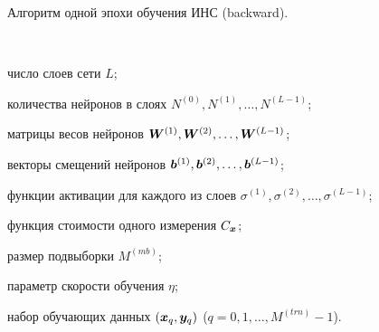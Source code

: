 \documentclass[a4paper,12pt,russian]{article} %
\begin{document}
\begin{algorithm}[t]
	\caption{
		Алгоритм одной эпохи обучения ИНС (backward).
	} \label{alg:nn_back}
	\begin{algorithmic}[1]
    	\Require $\;$
    	
    		число слоев сети $L$;
    		
    		количества нейронов в слоях $N^{(0)}, N^{(1)}, \ldots, N^{(L-1)}$;
    		
    		матрицы весов нейронов $\bm{W}^{(1)}, \bm{W}^{(2)}, \ldots, \bm{W}^{(L-1)}$;
    		
    		векторы смещений нейронов $\bm{b}^{(1)}, \bm{b}^{(2)}, \ldots, \bm{b}^{(L-1)}$;

    		функции активации для каждого из слоев $\sigma^{(1)}, \sigma^{(2)}, \ldots, \sigma^{(L-1)}$;
    		
    		функция стоимости одного измерения $C_{\bm{x}}$;
    		
			размер подвыборки $M^{(mb)}$;
			
			параметр скорости обучения $\eta$;
			
    		набор обучающих данных $(\bm{x}_{q}, \bm{y}_{q})$ ($q= 0, 1, \ldots, M^{(trn)}-1$).
    		

\end{algorithmic}
\end{algorithm}
\end{document}
